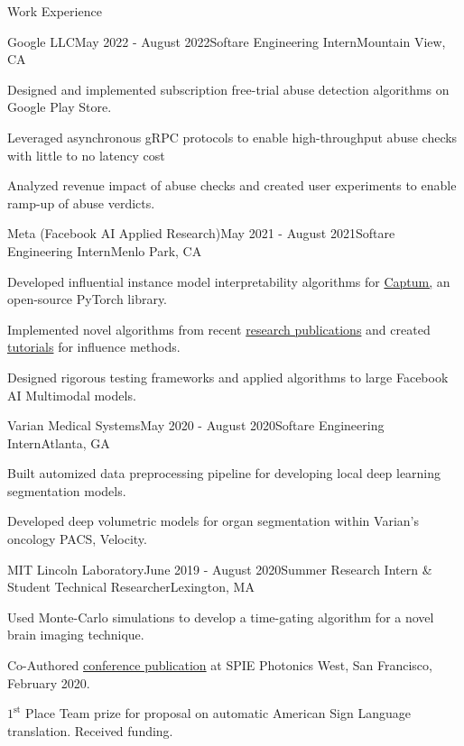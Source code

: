 \documentclass{template} %
\begin{document}
\begin{rSection}{Work Experience}

\begin{rSubsection}{Google LLC}{May 2022 - August 2022}{Softare Engineering Intern}{Mountain View, CA}
\item Designed and implemented subscription free-trial abuse detection algorithms on Google Play Store.
\item Leveraged asynchronous gRPC protocols to enable high-throughput abuse checks with little to no latency cost
\item Analyzed revenue impact of abuse checks and created user experiments to enable ramp-up of abuse verdicts.
\end{rSubsection}

\begin{rSubsection}{Meta (Facebook AI Applied Research)}{May 2021 - August 2021}{Softare Engineering Intern}{Menlo Park, CA}
\item Developed influential instance model interpretability algorithms for \href{https://captum.ai/}{Captum,} an open-source PyTorch library.
\item Implemented novel algorithms from recent \href{https://arxiv.org/pdf/2002.08484.pdf}{research publications} and created \href{https://captum.ai/tutorials/TracInCP_Tutorial}{tutorials} for influence methods.
\item Designed rigorous testing frameworks and applied algorithms to large Facebook AI Multimodal models.
\end{rSubsection}

\begin{rSubsection}{Varian Medical Systems}{May 2020 - August 2020}{Softare Engineering Intern}{Atlanta, GA}
\item Built automized data preprocessing pipeline for developing local deep learning segmentation models.
\item Developed deep volumetric models for organ segmentation within Varian's oncology PACS, Velocity.
\end{rSubsection}

\begin{rSubsection}{MIT Lincoln Laboratory}{June 2019 - August 2020}{Summer Research Intern \& Student Technical Researcher}{Lexington, MA}
\item Used Monte-Carlo simulations to develop a time-gating algorithm for a novel brain imaging technique.
\item Co-Authored \href{https://bit.ly/AGpaper1}{conference publication} at SPIE Photonics West, San Francisco, February 2020.
\item$1^{\text{st}}$ Place Team prize for proposal on automatic American Sign Language translation. Received funding.
\end{rSubsection}

\end{rSection}
\vspace{-2mm}
\end{document}
